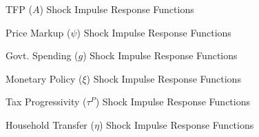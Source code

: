 \begin{figure}[ht]
    \centering
    \caption{TFP ($A$) Shock Impulse Response Functions}
    
    \label{fig:A-agg-irf}
\end{figure}

\begin{figure}[ht]
    \centering
    \caption{Price Markup ($\psi$) Shock Impulse Response Functions}
    
    \label{fig:psi-agg-irf}
\end{figure}

\begin{figure}[ht]
    \centering
    \caption{Govt. Spending ($g$) Shock Impulse Response Functions}
    
    \label{fig:g-agg-irf}
\end{figure}

\begin{figure}[ht]
    \centering
    \caption{Monetary Policy ($\xi$) Shock Impulse Response Functions}
    
    \label{fig:xi-agg-irf}
\end{figure}

\begin{figure}[ht]
    \centering
    \caption{Tax Progressivity ($\tau^P$) Shock Impulse Response Functions}
    
    \label{fig:tauP-agg-irf}
\end{figure}

\begin{figure}[ht]
    \centering
    \caption{Household Transfer ($\eta$) Shock Impulse Response Functions}
    
    \label{fig:eta-agg-irf}
\end{figure}

